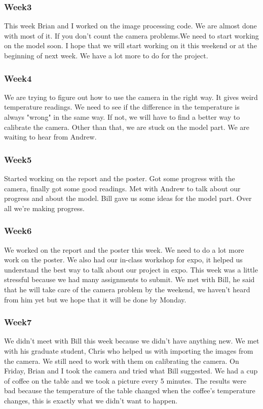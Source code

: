\subsubsection*{Week3}
	This week Brian and I worked on the image processing code. We are almost done with most of it. If you don't count the camera problems.We need to start working on the model soon. I hope that we will start working on it this weekend or at the beginning of next week. We have a lot more to do for the project. 
	
\subsubsection*{Week4}
	 We are trying to figure out how to use the camera in the right way. It gives weird temperature readings. We need to see if the difference in the temperature is always "wrong" in the same way. If not, we will have to find a better way to calibrate the camera. Other than that, we are stuck on the model part. We are waiting to hear from Andrew. 
	
\subsubsection*{Week5}
	Started working on the report and the poster. Got some progress with the camera, finally got some good readings. Met with Andrew to talk about our progress and about the model. Bill gave us some ideas for the model part. Over all we're making progress. 
\subsubsection*{Week6}
	We worked on the report and the poster this week. We need to do a lot more work on the poster. We also had our in-class workshop for expo, it helped us understand the best way to talk about our project in expo. This week was a little stressful because we had many assignments to submit. We met with Bill, he said that he will take care of the camera problem by the weekend, we haven't  heard from him yet but we hope that it will be done by Monday. 
	
\subsubsection*{Week7}
	We didn't meet with Bill this week because we didn't have anything new. We met with his graduate student, Chris who helped us with importing the images from the camera. We still need to work with them on calibrating the camera. On Friday, Brian and I took the camera and tried what Bill suggested. We had a cup of coffee on the table and we took a picture every 5 minutes. The results were bad because the temperature of the table changed when the coffee's temperature changes, this is exactly what we didn't want to happen. 
